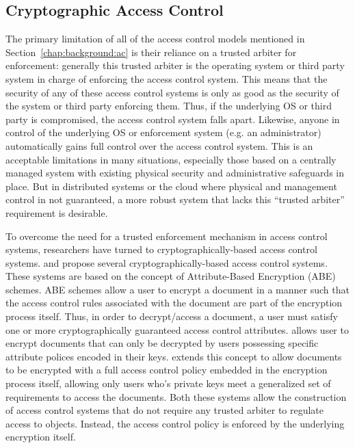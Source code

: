 \subsection{Cryptographic Access Control}

The primary limitation of all of the access control models mentioned
in Section~\ref{chap:background:ac} is their reliance on a trusted
arbiter for enforcement: generally this trusted arbiter is the
operating system or third party system in charge of enforcing the
access control system. This means that the security of any of these
access control systems is only as good as the security of the system
or third party enforcing them. Thus, if the underlying OS or third
party is compromised, the access control system falls apart. Likewise,
anyone in control of the underlying OS or enforcement system (e.g. an
administrator) automatically gains full control over the access
control system. This is an acceptable limitations in many situations,
especially those based on a centrally managed system with existing
physical security and administrative safeguards in place. But in
distributed systems or the cloud where physical and management control
in not guaranteed, a more robust system that lacks this ``trusted
arbiter'' requirement is desirable.

To overcome the need for a trusted enforcement mechanism in access
control systems, researchers have turned to cryptographically-based
access control systems. \cite{goyal2006} and \cite{bethencourt2007}
propose several cryptographically-based access control systems. These
systems are based on the concept of Attribute-Based Encryption (ABE)
schemes. ABE schemes allow a user to encrypt a document in a manner
such that the access control rules associated with the document are
part of the encryption process itself. Thus, in order to
decrypt/access a document, a user must satisfy one or more
cryptographically guaranteed access control attributes.
\cite{goyal2006} allows user to encrypt documents that can only be
decrypted by users possessing specific attribute polices encoded in
their keys. \cite{bethencourt2007} extends this concept to allow
documents to be encrypted with a full access control policy embedded
in the encryption process itself, allowing only users who's private
keys meet a generalized set of requirements to access the
documents. Both these systems allow the construction of access control
systems that do not require any trusted arbiter to regulate access to
objects. Instead, the access control policy is enforced by the
underlying encryption itself.


